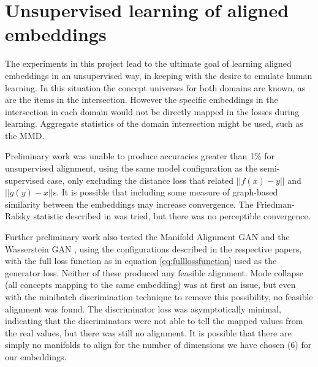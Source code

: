 \section{Unsupervised learning of aligned embeddings}

The experiments in this project lead to the ultimate goal of learning aligned embeddings in an unsupervised way, in keeping with the desire to emulate human learning. In this situation the concept universes for both domains are known, as are the items in the intersection. However the specific embeddings in the intersection in each domain would not be directly mapped in the losses during learning. Aggregate statistics of the domain intersection might be used, such as the MMD. 

Preliminary work was unable to produce accuracies greater than 1\% for unsupervised alignment, using the same model configuration as the semi-supervised case, only excluding the distance loss that related $||f(x) - y||$ and $||g(y) - x||$s. It is possible that including some measure of graph-based similarity between the embeddings may increase convergence. The Friedman-Rafsky statistic described in \cite{torchtwosample} was tried, but there was no perceptible convergence.

Further preliminary work also tested the Manifold Alignment GAN \cite{magan} and the Wasserstein GAN \cite{WassersteinGAN}, using the configurations described in the respective papers, with the full loss function as in  equation \ref{eq:fulllossfunction} used as the generator loss. Neither of these produced any feasible alignment. Mode collapse (all concepts mapping to the same embedding) was at first an issue, but even with the minibatch discrimination technique \cite{ImprovedTechniquesTrainingGANS} to remove this possibility, no feasible alignment was found. The discriminator loss was asymptotically minimal, indicating that the discriminators were not able to tell the mapped values from the real values, but there was still no alignment. It is possible that there are simply no manifolds to align for the number of dimensions we have chosen (6) for our embeddings. 


